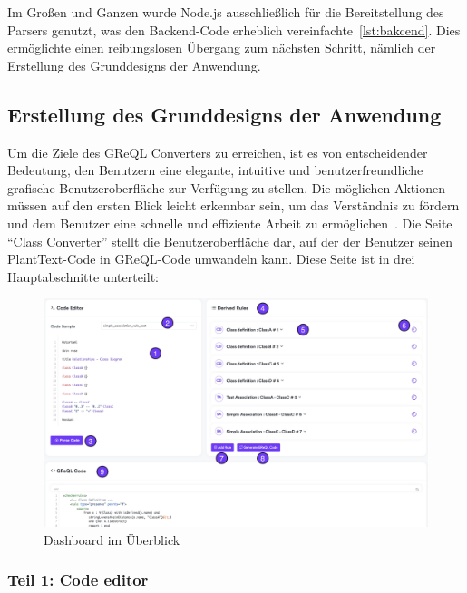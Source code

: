 Im Großen und Ganzen wurde Node.js ausschließlich für die Bereitstellung des Parsers genutzt, was den Backend-Code
erheblich vereinfachte~\ref{lst:bakcend}. Dies ermöglichte einen reibungslosen Übergang zum nächsten Schritt, nämlich
der Erstellung des Grunddesigns der Anwendung.

\subsection{Erstellung des Grunddesigns der Anwendung}\label{subsec:erstellung-des-grunddesigns-der-anwendung}

Um die Ziele des GReQL Converters zu erreichen, ist es von entscheidender Bedeutung, den Benutzern eine elegante,
intuitive und benutzerfreundliche grafische Benutzeroberfläche zur Verfügung zu stellen. Die möglichen Aktionen müssen
auf den ersten Blick leicht erkennbar sein, um das Verständnis zu fördern und dem Benutzer eine schnelle und effiziente
Arbeit zu ermöglichen~\cite{guntupalli2008user}. Die Seite ``Class Converter'' stellt die Benutzeroberfläche dar, auf
der der Benutzer seinen PlantText-Code in GReQL-Code umwandeln kann. Diese Seite ist in drei Hauptabschnitte unterteilt:

\begin{figure}
    \centering
    \includegraphics[width=16cm]{images/board}
    \caption{Dashboard im Überblick}
    \label{fig:dashboard}
\end{figure}

\subsubsection{Teil 1: Code editor}

